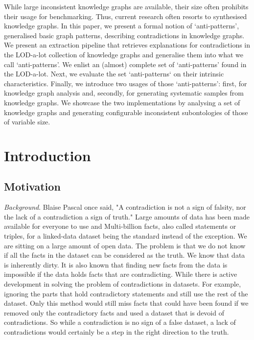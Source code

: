 \documentclass[11pt,letterpaper ,oneside ]{book}
\begin{document}
	While large inconsistent knowledge graphs are available, their size often prohibits their usage for benchmarking. Thus, current research often resorts to synthesised knowledge graphs. In this paper, we present a formal notion of `anti-patterns', generalised basic graph patterns, describing contradictions in knowledge graphs. We present an extraction pipeline that retrieves explanations for contradictions in the LOD-a-lot collection of knowledge graphs and generalise them into what we call `anti-patterns'. We enlist an (almost) complete set of `anti-patterns' found in the LOD-a-lot. Next, we evaluate the set `anti-patterns` on their intrinsic characteristics. Finally, we introduce two usages of those `anti-patterns': first, for knowledge graph analysis and, secondly, for generating systematic samples from knowledge graphs. We showcase the two implementations by analysing a set of knowledge graphs and generating configurable inconsistent subontologies of those of variable size. 
	
	\newpage
	\tableofcontents
	\newpage
	
	\chapter{Introduction}\label{Introduction}
	\section{Motivation}
	\textit{Background}. Blaise Pascal once said, "A contradiction is not a sign of falsity, nor the lack of a contradiction a sign of truth." Large amounts of data has been made available for everyone to use and Multi-billion facts, also called statements or triples, for a linked-data dataset being the standard instead of the exception. We are sitting on a large amount of open data. The problem is that we do not know if all the facts in the dataset can be considered as the truth. We know that data is inherently dirty. It is also known that finding new facts from the data is impossible if the data holds facts that are contradicting. While there is active development in solving the problem of contradictions in datasets. For example, ignoring the parts that hold contradictory statements and still use the rest of the dataset. Only this method would still miss facts that could have been found if we removed only the contradictory facts and used a dataset that is devoid of contradictions. So while a contradiction is no sign of a false dataset, a lack of contradictions would certainly be a step in the right direction to the truth.\\
	
\end{document}
